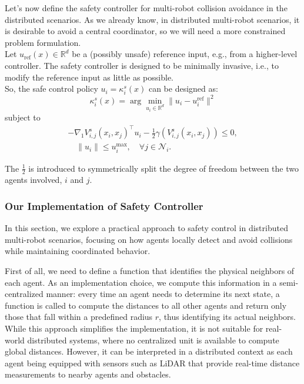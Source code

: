 \medskip
Let's now define the safety controller for multi-robot collision avoidance in the distributed scenarios.
As we already know, in distributed multi-robot scenarios, it is desirable to avoid a central coordinator, so we will need a more constrained problem formulation. \\
Let $u_{\mathrm{ref}}(x) \in \mathbb{R}^d$ be a (possibly unsafe) reference input, e.g., from a higher-level controller.  
The safety controller is designed to be minimally invasive, i.e., to modify the reference input as little as possible. \\
So, the safe control policy $u_i = \kappa_i^s(x)$ can be designed as:
\[
\kappa^s_i(x) = \arg\min_{u_i \in \mathbb{R}^d} \|u_i - u_i^{\mathrm{ref}}\|^2
\]
subject to
\begin{align*}
    -\nabla_1 V^s_{i,j}(x_i, x_j)^\top u_i - \tfrac{1}{2} \gamma (V^s_{i,j}(x_i, x_j)) \leq 0,  \\ 
    \quad \|u_i\| \leq u_i^{\max}, \quad \forall j \in \mathcal{N}_i. 
\end{align*}

The $\frac{1}{2}$ is introduced to symmetrically split the degree of freedom between the two agents involved, $i$ and $j$.

\subsubsection{Our Implementation of Safety Controller}
In this section, we explore a practical approach to safety control in distributed multi-robot scenarios, focusing on how agents locally detect and avoid collisions while maintaining coordinated behavior.

\medskip
First of all, we need to define a function that identifies the physical neighbors of each agent. As an implementation choice, we compute this information in a semi-centralized manner: every time an agent needs to determine its next state, a function is called to compute the distances to all other agents and return only those that fall within a predefined radius \( r \), thus identifying its actual neighbors. While this approach simplifies the implementation, it is not suitable for real-world distributed systems, where no centralized unit is available to compute global distances. However, it can be interpreted in a distributed context as each agent being equipped with sensors such as LiDAR that provide real-time distance measurements to nearby agents and obstacles.

